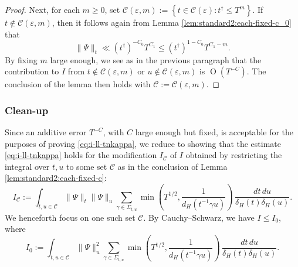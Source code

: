 \documentclass[reqno]{amsart}
\def\eps{\varepsilon}
\def\O{\operatorname{O}}
\theoremstyle{plain} \newtheorem{theorem} {Theorem}
\theoremstyle{definition} \newtheorem{definition} [theorem] {Definition}
\theoremstyle{itplain} %
\numberwithin{equation}{section}
\numberwithin{theorem}{section}
\renewcommand{\geq}{\geqslant}
\renewcommand{\leq}{\leqslant}
\begin{document}
\begin{proof}
  Next, for each $m \geq 0$, set $\mathcal{C}(\eps,m) := \left\{ t \in \mathcal{C}(\eps) : t ^\dagger \leq T^m \right\}$.  If $t \notin \mathcal{C}(\eps,m)$, then it follows again from Lemma \ref{lem:standard2:each-fixed-c_0} that
  \begin{equation*}
    \|\Psi\|_t \ll (t ^\dagger )^{-C_0} T^{C_1} \leq (t ^\dagger ) ^{1 - C_0} T^{C_1 - m}.
  \end{equation*}
  By fixing $m$ large enough, we see as in the previous paragraph that the contribution to $I$ from $t \notin \mathcal{C}(\eps,m)$ or $u \notin \mathcal{C}(\eps,m)$ is $\O(T^{-C})$.  The conclusion of the lemma then holds with $\mathcal{C} := \mathcal{C}(\eps,m)$.
\end{proof}

\subsubsection{Clean-up}
Since an additive error $T^{-C}$, with $C$ large enough but fixed, is acceptable for the purposes of proving \eqref{eq:i-ll-tnkappa}, we reduce to showing that the estimate \eqref{eq:i-ll-tnkappa} holds for the modification $I_{\mathcal{C}}$ of $I$ obtained by restricting the integral over $t,u$ to some set $\mathcal{C}$ as in the conclusion of Lemma \ref{lem:standard2:each-fixed-c}:
\begin{equation*}
  I_{\mathcal{C}} := 
  \int _{
    t, u \in \mathcal{C} 
  }
  \|\Psi\|_t \|\Psi\|_u
  \sum _{\gamma \in \Sigma_{t,u}}
  \min \left( T^{1/2}, \frac{1}{d_H(t^{-1} \gamma u)} \right) \, \frac{d t \, d u}{\delta_H(t) \delta_H(u)}.
\end{equation*}
We henceforth focus on one such set $\mathcal{C}$.  By Cauchy--Schwarz, we have $I \leq I_0$, where
\begin{equation*}
  I_0
  := \int _{t, u \in \mathcal{C} } \|\Psi\|_u^2
  \sum _{\gamma \in \Sigma_{t,u}}
  \min \left( T^{1/2}, \frac{1}{d_H(t^{-1} \gamma u)} \right)
  \, \frac{d t \, d u}{\delta_H(t) \delta_H(u)}.
\end{equation*}
\end{document}
